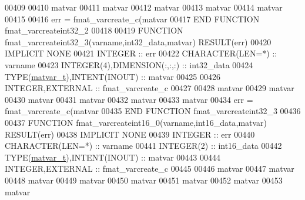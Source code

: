\begin{DoxyCode}
00409 
00410     matvar%
00411     matvar%
00412     matvar%
00413     matvar%
00414     matvar%
00415 
00416     err = fmat\_varcreate\_c(matvar%
00417 \textcolor{keyword}{END FUNCTION }fmat\_varcreateint32\_2
00418 
00419 \textcolor{keyword}{FUNCTION }fmat\_varcreateint32\_3(varname,int32\_data,matvar) \textcolor{keyword}{RESULT}(err)
00420 \textcolor{keywordtype}{IMPLICIT NONE}
00421     \textcolor{keywordtype}{INTEGER}                         :: err
00422     \textcolor{keywordtype}{CHARACTER(LEN=*)}                :: varname
00423     \textcolor{keywordtype}{INTEGER(4)},\textcolor{keywordtype}{DIMENSION(:,:,:)} :: int32\_data
00424     \textcolor{keywordtype}{TYPE}(\hyperlink{group___m_a_t_structmatvar__t}{matvar\_t}),\textcolor{keywordtype}{INTENT(INOUT)}    :: matvar
00425 
00426     \textcolor{keywordtype}{INTEGER},\textcolor{keywordtype}{EXTERNAL}                :: fmat\_varcreate\_c
00427 
00428     matvar%
00429     matvar%
00430     matvar%
00431     matvar%
00432     matvar%
00433     matvar%
00434     err = fmat\_varcreate\_c(matvar%
00435 \textcolor{keyword}{END FUNCTION }fmat\_varcreateint32\_3
00436 
00437 \textcolor{keyword}{FUNCTION }fmat\_varcreateint16\_0(varname,int16\_data,matvar) \textcolor{keyword}{RESULT}(err)
00438 \textcolor{keywordtype}{IMPLICIT NONE}
00439     \textcolor{keywordtype}{INTEGER}                         :: err
00440     \textcolor{keywordtype}{CHARACTER(LEN=*)}                :: varname
00441     \textcolor{keywordtype}{INTEGER(2)}                      :: int16\_data
00442     \textcolor{keywordtype}{TYPE}(\hyperlink{group___m_a_t_structmatvar__t}{matvar\_t}),\textcolor{keywordtype}{INTENT(INOUT)}    :: matvar
00443 
00444     \textcolor{keywordtype}{INTEGER},\textcolor{keywordtype}{EXTERNAL}                :: fmat\_varcreate\_c
00445 
00446     matvar%
00447     matvar%
00448     matvar%
00449     matvar%
00450     matvar%
00451     matvar%
00452     matvar%
00453     matvar%

\end{DoxyCode}
